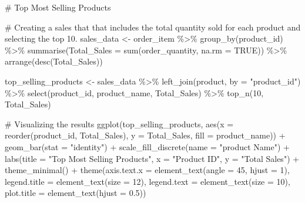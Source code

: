 \documentclass[
  letterpaper,
  DIV=11,
  numbers=noendperiod]{scrartcl}
\newenvironment{Shaded}{\begin{snugshade}}{\end{snugshade}}
\newcommand{\AttributeTok}[1]{\textcolor[rgb]{0.40,0.45,0.13}{#1}}
\newcommand{\CommentTok}[1]{\textcolor[rgb]{0.37,0.37,0.37}{#1}}
\newcommand{\ConstantTok}[1]{\textcolor[rgb]{0.56,0.35,0.01}{#1}}
\newcommand{\DecValTok}[1]{\textcolor[rgb]{0.68,0.00,0.00}{#1}}
\newcommand{\FloatTok}[1]{\textcolor[rgb]{0.68,0.00,0.00}{#1}}
\newcommand{\FunctionTok}[1]{\textcolor[rgb]{0.28,0.35,0.67}{#1}}
\newcommand{\NormalTok}[1]{\textcolor[rgb]{0.00,0.23,0.31}{#1}}
\newcommand{\OtherTok}[1]{\textcolor[rgb]{0.00,0.23,0.31}{#1}}
\newcommand{\SpecialCharTok}[1]{\textcolor[rgb]{0.37,0.37,0.37}{#1}}
\newcommand{\StringTok}[1]{\textcolor[rgb]{0.13,0.47,0.30}{#1}}
\begin{document}
\begin{Shaded}
\begin{Highlighting}[]
\CommentTok{\# Top Most Selling Products}

\CommentTok{\# Creating a sales that that includes the total quantity sold for each product and selecting the top 10.}
\NormalTok{sales\_data }\OtherTok{\textless{}{-}}\NormalTok{ order\_item }\SpecialCharTok{\%\textgreater{}\%}
  \FunctionTok{group\_by}\NormalTok{(product\_id) }\SpecialCharTok{\%\textgreater{}\%}
  \FunctionTok{summarise}\NormalTok{(}\AttributeTok{Total\_Sales =} \FunctionTok{sum}\NormalTok{(order\_quantity, }\AttributeTok{na.rm =} \ConstantTok{TRUE}\NormalTok{)) }\SpecialCharTok{\%\textgreater{}\%}
  \FunctionTok{arrange}\NormalTok{(}\FunctionTok{desc}\NormalTok{(Total\_Sales))}

\NormalTok{top\_selling\_products }\OtherTok{\textless{}{-}}\NormalTok{ sales\_data }\SpecialCharTok{\%\textgreater{}\%}
  \FunctionTok{left\_join}\NormalTok{(product, }\AttributeTok{by =} \StringTok{"product\_id"}\NormalTok{) }\SpecialCharTok{\%\textgreater{}\%}
  \FunctionTok{select}\NormalTok{(product\_id, product\_name, Total\_Sales) }\SpecialCharTok{\%\textgreater{}\%}
  \FunctionTok{top\_n}\NormalTok{(}\DecValTok{10}\NormalTok{, Total\_Sales)}

\CommentTok{\# Visualizing the results}
\FunctionTok{ggplot}\NormalTok{(top\_selling\_products, }\FunctionTok{aes}\NormalTok{(}\AttributeTok{x =} \FunctionTok{reorder}\NormalTok{(product\_id, Total\_Sales), }\AttributeTok{y =}\NormalTok{ Total\_Sales, }\AttributeTok{fill =}\NormalTok{ product\_name)) }\SpecialCharTok{+}
  \FunctionTok{geom\_bar}\NormalTok{(}\AttributeTok{stat =} \StringTok{"identity"}\NormalTok{) }\SpecialCharTok{+}
  \FunctionTok{scale\_fill\_discrete}\NormalTok{(}\AttributeTok{name =} \StringTok{"product Name"}\NormalTok{) }\SpecialCharTok{+} 
  \FunctionTok{labs}\NormalTok{(}\AttributeTok{title =} \StringTok{"Top Most Selling Products"}\NormalTok{, }\AttributeTok{x =} \StringTok{"Product ID"}\NormalTok{, }\AttributeTok{y =} \StringTok{"Total Sales"}\NormalTok{) }\SpecialCharTok{+}
  \FunctionTok{theme\_minimal}\NormalTok{() }\SpecialCharTok{+}
  \FunctionTok{theme}\NormalTok{(}\AttributeTok{axis.text.x =} \FunctionTok{element\_text}\NormalTok{(}\AttributeTok{angle =} \DecValTok{45}\NormalTok{, }\AttributeTok{hjust =} \DecValTok{1}\NormalTok{),}
        \AttributeTok{legend.title =} \FunctionTok{element\_text}\NormalTok{(}\AttributeTok{size =} \DecValTok{12}\NormalTok{), }
        \AttributeTok{legend.text =} \FunctionTok{element\_text}\NormalTok{(}\AttributeTok{size =} \DecValTok{10}\NormalTok{), }
        \AttributeTok{plot.title =} \FunctionTok{element\_text}\NormalTok{(}\AttributeTok{hjust =} \FloatTok{0.5}\NormalTok{))}
\end{Highlighting}
\end{Shaded}
\end{document}
